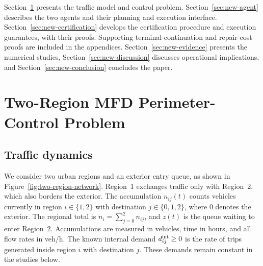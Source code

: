 \documentclass[preprint,12pt]{elsarticle}
\theoremstyle{definition}
\theoremstyle{plain}
\theoremstyle{definition}
\theoremstyle{plain}
\begin{document}
Section~\ref{sec:new-problem} presents the traffic model and control
problem. Section~\ref{sec:new-agent} describes the two agents and their
planning and execution interface. Section~\ref{sec:new-certification} develops the
certification procedure and execution guarantees, with their proofs.
Supporting terminal-continuation and repair-cost proofs are included in
the appendices.
Section~\ref{sec:new-evidence} presents the numerical studies,
Section~\ref{sec:new-discussion} discusses operational implications, and
Section~\ref{sec:new-conclusion} concludes the paper.

\section{Two-Region MFD Perimeter-Control Problem}
\label{sec:new-problem}

\subsection{Traffic dynamics}
\label{app:new-model}

We consider two urban regions and an exterior entry queue, as shown in
Figure~\ref{fig:two-region-network}. Region~1 exchanges traffic only
with Region~2, which also borders the exterior. The accumulation $n_{ij}(t)$ counts
vehicles currently in region $i\in\{1,2\}$ with destination
$j\in\{0,1,2\}$, where $0$ denotes the exterior. The regional total is
$n_i=\sum_{j=0}^2n_{ij}$, and $z(t)$ is the queue waiting to enter
Region~2. Accumulations are measured in vehicles, time in hours, and all
flow rates in veh/h. The known internal demand $d_{ij}^{\rm int}\ge0$ is the
rate of trips generated inside region $i$ with destination $j$. These
demands remain constant in the studies below.
\end{document}
